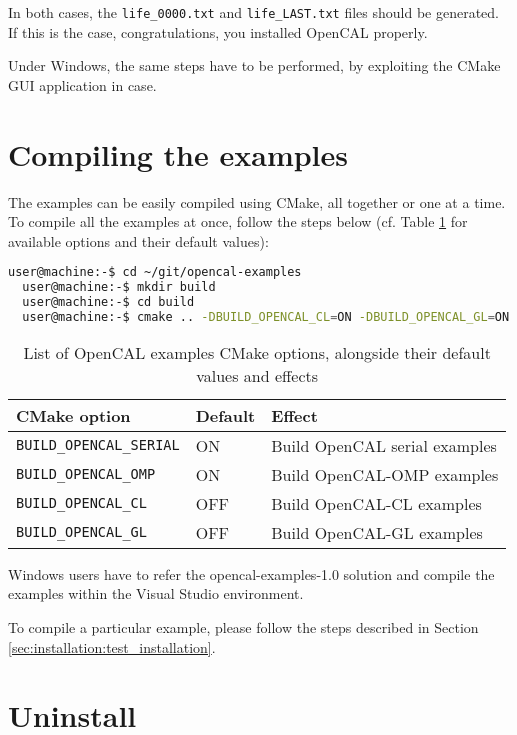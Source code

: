 In both cases, the \verb'life_0000.txt' and \verb'life_LAST.txt' files
should be generated. If this is the case, congratulations, you
installed OpenCAL properly.

Under Windows, the same steps have to be performed, by exploiting the
CMake GUI application in case.

\section{Compiling the examples}

The examples can be easily compiled using CMake, all together or one
at a time. To compile all the examples at once, follow the steps below
(cf. Table \ref{ch:installation:cmakeoptions-example} for available
options and their default values):

\begin{lstlisting}[numbers=none,language=bash]
  user@machine:-$ cd ~/git/opencal-examples
  user@machine:-$ mkdir build
  user@machine:-$ cd build
  user@machine:-$ cmake .. -DBUILD_OPENCAL_CL=ON -DBUILD_OPENCAL_GL=ON
\end{lstlisting}


\begin{table}[h]
  \centering
  \caption{List of OpenCAL examples CMake options, alongside their default values and
    effects}
  \label{ch:installation:cmakeoptions-example}
  \begin{tabular}{lll}
    \hline
    CMake option &  Default & Effect\\
    \hline
    \verb'BUILD_OPENCAL_SERIAL' & ON  & Build OpenCAL serial examples\\
    \verb'BUILD_OPENCAL_OMP'    & ON  & Build OpenCAL-OMP examples\\
    \verb'BUILD_OPENCAL_CL'     & OFF & Build OpenCAL-CL examples\\
    \verb'BUILD_OPENCAL_GL'     & OFF & Build OpenCAL-GL examples\\
     \hline
  \end{tabular}
\end{table}

Windows users have to refer the opencal-examples-1.0 solution and
compile the examples within the Visual Studio environment.

To compile a particular example, please follow the steps described in
Section \ref{sec:installation:test_installation}.

\section{Uninstall}

